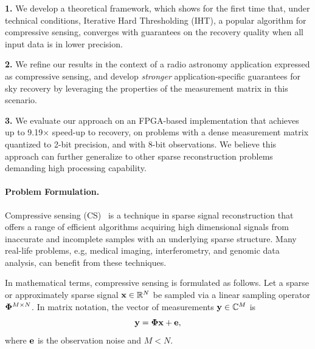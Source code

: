 \documentclass{article}
\begin{document}
{\bf 1.} We develop a theoretical framework, which shows for the first time that, under
technical conditions, Iterative Hard Thresholding (IHT),
a popular algorithm for compressive sensing, converges
with guarantees on the recovery quality when all 
input data is in lower precision.

{\bf 2.} We refine our results in the context of a radio
astronomy application expressed as  compressive sensing, 
and develop {\em stronger} application-specific 
guarantees for sky recovery by leveraging the properties of the measurement matrix in this scenario.

{\bf 3. } We evaluate our approach on an FPGA-based
implementation that achieves up to 9.19$\times$ speed-up to recovery,  
on problems with a dense measurement matrix quantized to 2-bit precision, and with 8-bit observations.
We believe this approach can further generalize to other sparse reconstruction problems demanding high processing capability.


\vspace{-0.5em}
\paragraph{Problem Formulation.}
Compressive sensing (CS)~\cite{donoho2006cs, candes2006cs, candes2006cs2} is a technique in sparse signal reconstruction that offers a range of efficient algorithms acquiring high dimensional signals from inaccurate and incomplete samples with an underlying sparse structure. 
Many real-life problems, e.g, medical imaging, interferometry, and genomic data analysis, can benefit from these techniques.

In mathematical terms, compressive sensing is formulated as follows. Let a sparse or approximately sparse signal ${\bf x}\in \mathbb{R}^N$ be sampled via a linear sampling operator ${\bf \Phi}^{M\times N}$. In matrix notation, the vector of measurements ${\bf y} \in \mathbb{C}^M$ is
\vspace{-.3em}
\begin{equation}\label{CS_model}
\small
 {\bf y} =  {\bf \Phi}  {\bf x} + {\bf e},
\end{equation}
where ${\bf e}$ is the observation noise and $M < N$.
\end{document}
